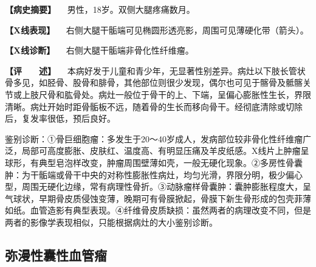 \textbf{【病史摘要】} 　男性，18岁。双侧大腿疼痛数月。

\textbf{【X线表现】}
　右侧大腿干骺端可见椭圆形透亮影，周围可见薄硬化带（箭头）。

\textbf{【X线诊断】} 　右侧大腿干骺端非骨化性纤维瘤。

\textbf{【评　　述】}
　本病好发于儿童和青少年，无显著性别差异。病灶以下肢长管状骨多见，如胫骨、股骨和腓骨，其他部位则很少发现，偶尔也可见于髂骨及骶髂关节或上肢尺骨和肱骨处。病灶一般位于骨干的上、下端，呈偏心膨胀性生长，界限清晰。病灶开始时距骨骺板不远，随着骨的生长而移向骨干。经彻底清除或切除后，复发率很低，预后良好。

鉴别诊断：①骨巨细胞瘤：多发生于20～40岁成人，发病部位较非骨化性纤维瘤广泛，局部可高度膨胀、皮肤红、温度高、有明显压痛及羊皮纸感。X线片上肿瘤呈球形，有典型皂泡样改变，肿瘤周围壁薄如壳，一般无硬化现象。②多房性骨囊肿：为干骺端或骨干中央的对称性膨胀性病灶，均匀光滑，界限分明，极少偏心型，周围无硬化边缘，常有病理性骨折。③动脉瘤样骨囊肿：囊肿膨胀程度大，呈气球状，早期骨皮质侵蚀变薄，晚期可有骨膜掀起，骨膜下新生骨形成的包壳菲薄如纸。血管造影有典型表现。④纤维骨皮质缺损：虽然两者的病理改变不同，但是两者的影像学表现相似，只能根据病灶的大小鉴别诊断。

\subsection{弥漫性囊性血管瘤}

